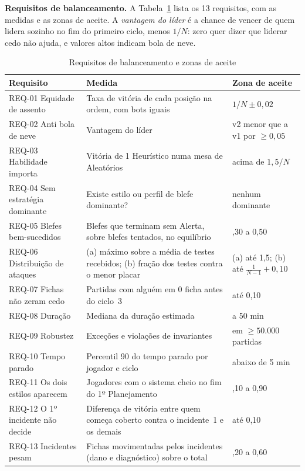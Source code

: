 
\textbf{Requisitos de balanceamento.} A Tabela~\ref{tab:requisitos} lista os 13 requisitos, com as medidas e as
zonas de aceite. A \emph{vantagem do líder} é a chance de vencer de quem
lidera sozinho no fim do primeiro ciclo, menos $1/N$: zero quer dizer que liderar cedo não ajuda, e valores altos
indicam bola de neve.

\begin{table}[ht]
  \centering
  \caption{Requisitos de balanceamento e zonas de aceite}
  \label{tab:requisitos}
  \footnotesize
  \begin{tabularx}{\linewidth}{>{\raggedright\arraybackslash}p{3.1cm} >{\raggedright\arraybackslash}X
      >{\raggedright\arraybackslash}p{3.3cm}}
    \toprule
    Requisito & Medida & Zona de aceite \\
    \midrule
    REQ-01 Equidade de assento & Taxa de vitória de cada posição na ordem, com bots iguais & $1/N \pm 0{,}02$ \\
    REQ-02 Anti bola de neve & Vantagem do líder & v2 menor que a v1 por $\geq 0{,}05$ \\
    REQ-03 Habilidade importa & Vitória de 1 Heurístico numa mesa de Aleatórios & acima de $1{,}5/N$ \\
    REQ-04 Sem estratégia dominante & Existe estilo ou perfil de blefe dominante? & nenhum dominante \\
    REQ-05 Blefes bem-sucedidos & Blefes que terminam sem Alerta, sobre blefes tentados, no equilíbrio & 0,30 a 0,50 \\
    REQ-06 Distribuição de ataques & (a) máximo sobre a média de testes recebidos; (b) fração dos testes contra o menor placar & (a) até 1,5; (b) até $\frac{1}{N-1}+0{,}10$ \\
    REQ-07 Fichas não zeram cedo & Partidas com alguém em 0 ficha antes do ciclo~3 & até 0,10 \\
    REQ-08 Duração & Mediana da duração estimada & 40 a 50 min \\
    REQ-09 Robustez & Exceções e violações de invariantes & 0 em $\geq 50.000$ partidas \\
    REQ-10 Tempo parado & Percentil 90 do tempo parado por jogador e ciclo & abaixo de 5 min \\
    REQ-11 Os dois estilos aparecem & Jogadores com o sistema cheio no fim do 1º Planejamento & 0,10 a 0,90 \\
    REQ-12 O 1º incidente não decide & Diferença de vitória entre quem começa coberto contra o incidente~1 e os demais & até 0,10 \\
    REQ-13 Incidentes pesam & Fichas movimentadas pelos incidentes (dano e diagnóstico) sobre o total & 0,20 a 0,60 \\
    \bottomrule
  \end{tabularx}
\end{table}

